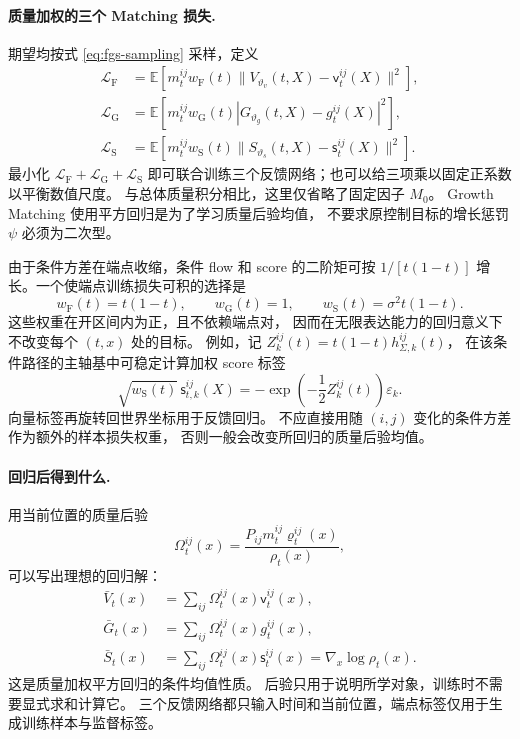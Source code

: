 \documentclass[UTF8,a4paper,11pt,fontset=fandol]{ctexart}
\begin{document}
\paragraph{质量加权的三个 Matching 损失.}
期望均按式 \eqref{eq:fgs-sampling} 采样，定义
\begin{equation}
\begin{aligned}
\mathcal L_{\mathrm F}
&=\mathbb E\!\left[m_t^{ij}w_{\mathrm F}(t)
\|V_{\vartheta_v}(t,X)-\mathsf v_t^{ij}(X)\|^2\right],\\
\mathcal L_{\mathrm G}
&=\mathbb E\!\left[m_t^{ij}w_{\mathrm G}(t)
|G_{\vartheta_g}(t,X)-g_t^{ij}(X)|^2\right],\\
\mathcal L_{\mathrm S}
&=\mathbb E\!\left[m_t^{ij}w_{\mathrm S}(t)
\|S_{\vartheta_s}(t,X)-\mathsf s_t^{ij}(X)\|^2\right].
\end{aligned}
\label{eq:fgs-three-losses}
\end{equation}
最小化 $\mathcal L_{\mathrm F}+\mathcal L_{\mathrm G}+\mathcal L_{\mathrm S}$
即可联合训练三个反馈网络；也可以给三项乘以固定正系数以平衡数值尺度。
与总体质量积分相比，这里仅省略了固定因子 $M_0$。
Growth Matching 使用平方回归是为了学习质量后验均值，
不要求原控制目标的增长惩罚 $\psi$ 必须为二次型。

由于条件方差在端点收缩，条件 flow 和 score 的二阶矩可按
$1/[t(1-t)]$ 增长。一个使端点训练损失可积的选择是
\begin{equation}
w_{\mathrm F}(t)=t(1-t),\qquad
w_{\mathrm G}(t)=1,\qquad
w_{\mathrm S}(t)=\sigma^2t(1-t).
\label{eq:fgs-time-weights}
\end{equation}
这些权重在开区间内为正，且不依赖端点对，
因而在无限表达能力的回归意义下不改变每个 $(t,x)$ 处的目标。
例如，记 $Z_k^{ij}(t)=t(1-t)h_{\Sigma,k}^{ij}(t)$，
在该条件路径的主轴基中可稳定计算加权 score 标签
\begin{equation}
\sqrt{w_{\mathrm S}(t)}\,\mathsf s_{t,k}^{ij}(X)
=-\exp\!\left(-\frac12Z_k^{ij}(t)\right)\varepsilon_k.
\end{equation}
向量标签再旋转回世界坐标用于反馈回归。
不应直接用随 $(i,j)$ 变化的条件方差作为额外的样本损失权重，
否则一般会改变所回归的质量后验均值。

\paragraph{回归后得到什么.}
用当前位置的质量后验
\begin{equation}
\Omega_t^{ij}(x)=\frac{P_{ij}m_t^{ij}\varrho_t^{ij}(x)}{\rho_t(x)},
\end{equation}
可以写出理想的回归解：
\begin{equation}
\begin{aligned}
\bar V_t(x)&=\sum_{ij}\Omega_t^{ij}(x)\mathsf v_t^{ij}(x),\\
\bar G_t(x)&=\sum_{ij}\Omega_t^{ij}(x)g_t^{ij}(x),\\
\bar S_t(x)&=\sum_{ij}\Omega_t^{ij}(x)\mathsf s_t^{ij}(x)
=\nabla_x\log\rho_t(x).
\end{aligned}
\label{eq:fgs-posterior-regression}
\end{equation}
这是质量加权平方回归的条件均值性质。
后验只用于说明所学对象，训练时不需要显式求和计算它。
三个反馈网络都只输入时间和当前位置，端点标签仅用于生成训练样本与监督标签。
\end{document}
